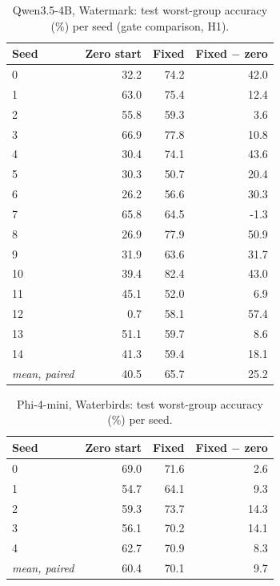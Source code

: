 \documentclass[10pt]{article}
\begin{document}
\begin{longtable}{lrrr}
\caption{Qwen3.5-4B, Watermark: test worst-group accuracy (\%) per seed (gate comparison, H1).}\label{tab:s-h1-water}\\
\toprule
Seed & Zero start & Fixed & Fixed $-$ zero \\ \midrule
\endhead
0 & 32.2 & 74.2 & 42.0 \\
1 & 63.0 & 75.4 & 12.4 \\
2 & 55.8 & 59.3 & 3.6 \\
3 & 66.9 & 77.8 & 10.8 \\
4 & 30.4 & 74.1 & 43.6 \\
5 & 30.3 & 50.7 & 20.4 \\
6 & 26.2 & 56.6 & 30.3 \\
7 & 65.8 & 64.5 & -1.3 \\
8 & 26.9 & 77.9 & 50.9 \\
9 & 31.9 & 63.6 & 31.7 \\
10 & 39.4 & 82.4 & 43.0 \\
11 & 45.1 & 52.0 & 6.9 \\
12 & 0.7 & 58.1 & 57.4 \\
13 & 51.1 & 59.7 & 8.6 \\
14 & 41.3 & 59.4 & 18.1 \\
\textit{mean, paired} & 40.5 & 65.7 & 25.2 \\
\bottomrule
\end{longtable}

\begin{longtable}{lrrr}
\caption{Phi-4-mini, Waterbirds: test worst-group accuracy (\%) per seed.}\label{tab:s-phi-water}\\
\toprule
Seed & Zero start & Fixed & Fixed $-$ zero \\ \midrule
\endhead
0 & 69.0 & 71.6 & 2.6 \\
1 & 54.7 & 64.1 & 9.3 \\
2 & 59.3 & 73.7 & 14.3 \\
3 & 56.1 & 70.2 & 14.1 \\
4 & 62.7 & 70.9 & 8.3 \\
\textit{mean, paired} & 60.4 & 70.1 & 9.7 \\
\bottomrule
\end{longtable}
\end{document}
